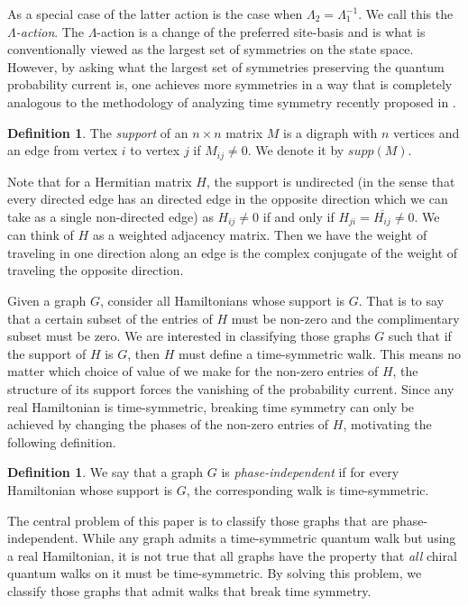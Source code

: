 \documentclass[twocolumn,superscriptaddress]{revtex4-1}
\theoremstyle{plain}
\theoremstyle{definition}
\newtheorem{defn}[theorem]{Definition}%
\theoremstyle{definition}
\theoremstyle{definition}
\theoremstyle{definition}
\theoremstyle{definition}
\theoremstyle{definition}
\begin{document}
As a special case of the latter action is the case when $\Lambda_2=\Lambda_1^{-1}$. We call this the \emph{$\Lambda$-action}. The $\Lambda$-action is a change of the preferred site-basis and is what is conventionally viewed as the largest set of symmetries on the state space. However, by asking what the largest set of symmetries preserving the quantum probability current is, one achieves more symmetries in a way that is completely analogous to the methodology of analyzing time symmetry recently proposed in \cite{oreshkov2015operational}.

\begin{defn}
 The \emph{support} of an $n\times n$ matrix $M$ is a digraph with $n$ vertices and an edge from vertex $i$ to vertex $j$ if $M_{ij}\ne0$. We denote it by $supp(M)$.
\end{defn}

Note that for a Hermitian matrix $H$, the support is undirected (in the sense that every directed edge has an directed edge in the opposite direction which we can take as a single non-directed edge) as $H_{ij}\ne0$ if and only if $H_{ji}=\overline{H_{ij}}\ne0$. We can think of $H$ as a weighted adjacency matrix. Then we have the weight of traveling in one direction along an edge is the complex conjugate of the weight of traveling the opposite direction.

Given a graph $G$, consider all Hamiltonians whose support is $G$. That is to say that a certain subset of the entries of $H$ must be non-zero and the complimentary subset must be zero. We are interested in classifying those graphs $G$ such that if the support of $H$ is $G$, then $H$ must define a time-symmetric walk. This means no matter which choice of value of we make for the non-zero entries of $H$, the structure of its support forces the vanishing of the probability current. Since any real Hamiltonian is time-symmetric, breaking time symmetry can only be achieved by changing the phases of the non-zero entries of $H$, motivating the following definition.

\begin{defn}
 We say that a graph $G$ is \emph{phase-independent} if for every Hamiltonian whose support is $G$, the corresponding walk is time-symmetric.
\end{defn}

The central problem of this paper is to classify those graphs that are phase-independent. While any graph admits a time-symmetric quantum walk but using a real Hamiltonian, it is not true that all graphs have the property that \emph{all} chiral quantum walks on it must be time-symmetric. By solving this problem, we classify those graphs that admit walks that break time symmetry.
\end{document}
